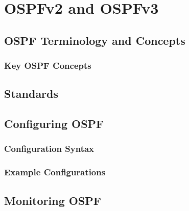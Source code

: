%
% 

\chapter{OSPFv2 and OSPFv3}
\label{ospf}
\section{OSPF  Terminology and Concepts}

\subsection{Key OSPF Concepts}

\section{Standards}

\newpage
\section{Configuring OSPF}

\subsection{Configuration Syntax}

\subsection{Example Configurations}

\newpage
\section{Monitoring OSPF}
